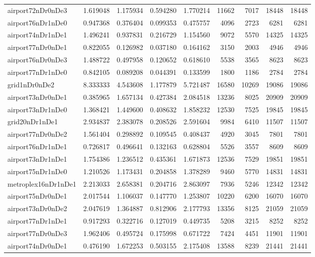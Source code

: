 \begin{longtable}{|l|r|r|r|r|r|r|r|r|}
airport72nDr0nDe3 & 1.619048 & 1.175934 & 0.594280 & 1.770214 & 11662 & 7017 & 18448 & 18448 \\
airport76nDr1nDe0 & 0.947368 & 0.376404 & 0.099353 & 0.475757 & 4096 & 2723 & 6281 & 6281 \\
airport74nDr1nDe1 & 1.496241 & 0.937831 & 0.216729 & 1.154560 & 9072 & 5570 & 14325 & 14325 \\
airport77nDr0nDe1 & 0.822055 & 0.126982 & 0.037180 & 0.164162 & 3150 & 2003 & 4946 & 4946 \\
airport76nDr0nDe3 & 1.488722 & 0.497958 & 0.120652 & 0.618610 & 5538 & 3565 & 8623 & 8623 \\
airport77nDr1nDe0 & 0.842105 & 0.089208 & 0.044391 & 0.133599 & 1800 & 1186 & 2784 & 2784 \\
grid1nDr0nDe2 & 8.333333 & 4.543608 & 1.177879 & 5.721487 & 16580 & 10269 & 19086 & 19086 \\
airport73nDr0nDe1 & 0.385965 & 1.657134 & 0.427384 & 2.084518 & 13236 & 8025 & 20909 & 20909 \\
airport73nDr1nDe0 & 1.368421 & 1.449600 & 0.408632 & 1.858232 & 12530 & 7525 & 19845 & 19845 \\
grid20nDr1nDe1 & 2.934837 & 2.383078 & 0.208526 & 2.591604 & 9984 & 6410 & 11507 & 11507 \\
airport77nDr0nDe2 & 1.561404 & 0.298892 & 0.109545 & 0.408437 & 4920 & 3045 & 7801 & 7801 \\
airport76nDr1nDe1 & 0.726817 & 0.496641 & 0.132163 & 0.628804 & 5526 & 3557 & 8609 & 8609 \\
airport73nDr1nDe1 & 1.754386 & 1.236512 & 0.435361 & 1.671873 & 12536 & 7529 & 19851 & 19851 \\
airport75nDr1nDe0 & 1.210526 & 1.173431 & 0.204858 & 1.378289 & 9460 & 5770 & 14831 & 14831 \\
metroplex16nDr1nDe1 & 2.213033 & 2.658381 & 0.204716 & 2.863097 & 7936 & 5246 & 12342 & 12342 \\
airport75nDr0nDe1 & 2.017544 & 1.106037 & 0.147770 & 1.253807 & 10220 & 6200 & 16070 & 16070 \\
airport73nDr0nDe2 & 2.047619 & 1.364887 & 0.812906 & 2.177793 & 13356 & 8125 & 21059 & 21059 \\
airport77nDr1nDe1 & 0.917293 & 0.322716 & 0.127019 & 0.449735 & 5208 & 3215 & 8252 & 8252 \\
airport77nDr0nDe3 & 1.962406 & 0.495724 & 0.175998 & 0.671722 & 7424 & 4451 & 11901 & 11901 \\
airport74nDr0nDe1 & 0.476190 & 1.672253 & 0.503155 & 2.175408 & 13588 & 8239 & 21441 & 21441 \\

\end{longtable}
